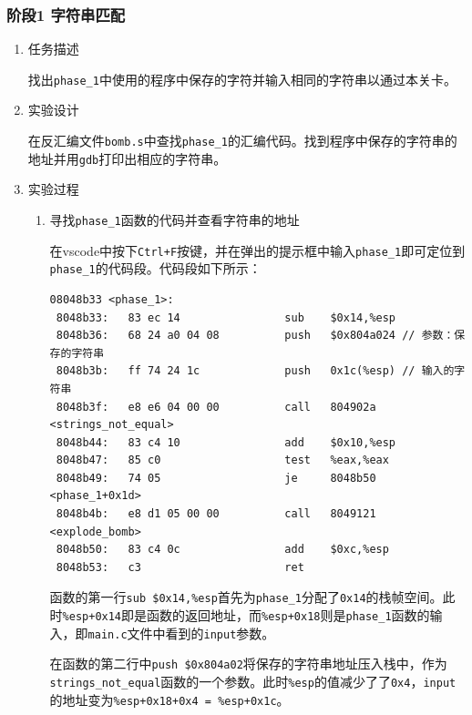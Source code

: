 \documentclass{paper}
\begin{document}
\subsubsection{阶段1 字符串匹配}
\begin{enumerate}
    \item 任务描述
    
            找出\verb|phase_1|中使用的程序中保存的字符并输入相同的字符串以通过本关卡。
    
    \item 实验设计

            在反汇编文件\verb|bomb.s|中查找\verb|phase_1|的汇编代码。找到程序中保存的字符串的地址并用\verb|gdb|打印出相应的字符串。
            
    \item 实验过程

            \begin{enumerate}
                \item 寻找\verb|phase_1|函数的代码并查看字符串的地址
                        
                        在vscode中按下\verb|Ctrl+F|按键，并在弹出的提示框中输入\verb|phase_1|即可定位到\verb|phase_1|的代码段。代码段如下所示：

                        \begin{lstlisting}
08048b33 <phase_1>:
 8048b33:	83 ec 14             	sub    $0x14,%esp
 8048b36:	68 24 a0 04 08       	push   $0x804a024 // 参数：保存的字符串
 8048b3b:	ff 74 24 1c          	push   0x1c(%esp) // 输入的字符串
 8048b3f:	e8 e6 04 00 00       	call   804902a <strings_not_equal>
 8048b44:	83 c4 10             	add    $0x10,%esp
 8048b47:	85 c0                	test   %eax,%eax
 8048b49:	74 05                	je     8048b50 <phase_1+0x1d>
 8048b4b:	e8 d1 05 00 00       	call   8049121 <explode_bomb>
 8048b50:	83 c4 0c             	add    $0xc,%esp
 8048b53:	c3                   	ret
                        \end{lstlisting}

                        函数的第一行\verb|sub $0x14,%esp|首先为\verb|phase_1|分配了\verb|0x14|的栈帧空间。此时\verb|%esp+0x14|即是函数的返回地址，而\verb|%esp+0x18|则是\verb|phase_1|函数的输入，即\verb|main.c|文件中看到的\verb|input|参数。

                        在函数的第二行中\verb|push $0x804a02|将保存的字符串地址压入栈中，作为\verb|strings_not_equal|函数的一个参数。此时\verb|%esp|的值减少了了\verb|0x4|，\verb|input|的地址变为\verb|%esp+0x18+0x4 = %esp+0x1c|。


\end{enumerate}
\end{enumerate}
\end{document}
